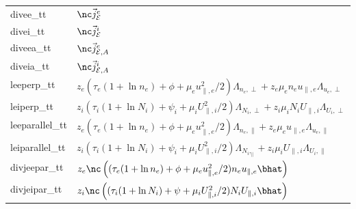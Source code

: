 \begin{longtable}{ll}
    divee\_tt &$\nc \vec j_{\mathcal E}^e$ \\
    divei\_tt &$\nc \vec j_{\mathcal E}^i$ \\
    diveea\_tt &$\nc \vec j_{\mathcal E,A}^e$\\
    diveia\_tt &$\nc \vec j_{\mathcal E,A}^i$\\
    leeperp\_tt &$z_e(\tau_e(1+\ln n_e) + \phi + \mu_eu_{\parallel,e}^2/2) \Lambda_{n_e,\perp} + z_e\mu_e n_e u_{\parallel,e} \Lambda_{u_e,\perp}$ \\
    leiperp\_tt &$z_i(\tau_i(1+\ln N_i) + \psi_i + \mu_iU_{\parallel,i}^2/2) \Lambda_{N_i,\perp} + z_i\mu_i N_i U_{\parallel,i} \Lambda_{U_i,\perp}$ \\
    leeparallel\_tt & $z_e(\tau_e(1+\ln n_e) + \phi + \mu_eu_{\parallel,e}^2/2) \Lambda_{n_e,\parallel} +
    z_e\mu_e u_{\parallel,e} \Lambda_{u_e, \parallel}$ \\
    leiparallel\_tt & $z_i(\tau_i(1+\ln N_i) + \psi_i + \mu_iU_{\parallel,i}^2/2)\Lambda_{N_i,_\parallel} +
    z_i\mu_i U_{\parallel,i} \Lambda_{U_i,\parallel}$ \\
    divjeepar\_tt &$ z_e\nc \left( (\tau_e(1+\ln n_e) + \phi + \mu_eu_{\parallel,e}^2/2) n_eu_{\parallel,e}\bhat\right)$ \\
    divjeipar\_tt &$ z_i\nc \left( (\tau_i(1+\ln N_i) + \psi + \mu_iU_{\parallel,i}^2/2) N_iU_{\parallel,i}\bhat\right)$ \\
\bottomrule
\end{longtable}

